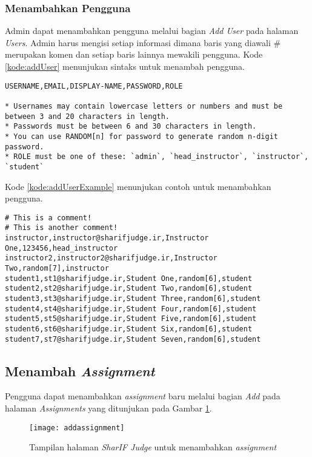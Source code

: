 \subsubsection{Menambahkan Pengguna}

Admin dapat menambahkan pengguna melalui bagian \textit{Add User} pada halaman \textit{Users}. Admin harus mengisi setiap informasi dimana baris yang diawali \# merupakan komen dan setiap baris lainnya mewakili pengguna. Kode \ref{kode:addUser} menunjukan sintaks untuk menambah pengguna.
\begin{lstlisting}[caption=Sintaks untuk menambahkan pengguna, label=kode:addUser]
USERNAME,EMAIL,DISPLAY-NAME,PASSWORD,ROLE

* Usernames may contain lowercase letters or numbers and must be between 3 and 20 characters in length.
* Passwords must be between 6 and 30 characters in length.
* You can use RANDOM[n] for password to generate random n-digit password.
* ROLE must be one of these: `admin`, `head_instructor`, `instructor`, `student`
\end{lstlisting}

Kode \ref{kode:addUserExample} menunjukan contoh untuk menambahkan pengguna.
\begin{lstlisting}[caption=Contoh kode untuk menambahkan pengguna, label=kode:addUserExample]
# This is a comment!
# This is another comment!
instructor,instructor@sharifjudge.ir,Instructor One,123456,head_instructor
instructor2,instructor2@sharifjudge.ir,Instructor Two,random[7],instructor
student1,st1@sharifjudge.ir,Student One,random[6],student
student2,st2@sharifjudge.ir,Student Two,random[6],student
student3,st3@sharifjudge.ir,Student Three,random[6],student
student4,st4@sharifjudge.ir,Student Four,random[6],student
student5,st5@sharifjudge.ir,Student Five,random[6],student
student6,st6@sharifjudge.ir,Student Six,random[6],student
student7,st7@sharifjudge.ir,Student Seven,random[6],student
\end{lstlisting}

\subsection{Menambah \textit{Assignment}}
\label{sec:addAssignment}
Pengguna dapat menambahkan \textit{assignment} baru melalui bagian \textit{Add} pada halaman \textit{Assignments} yang ditunjukan pada Gambar \ref{fig:addassignment}.
\begin{figure}[H]
	\centering  
	\texttt{[image: addassignment]}  
	\caption[Tampilan halaman \textit{SharIF Judge} untuk menambahkan \textit{assignment}]{Tampilan halaman \textit{SharIF Judge} untuk menambahkan \textit{assignment}} 
	\label{fig:addassignment} 
\end{figure} 

